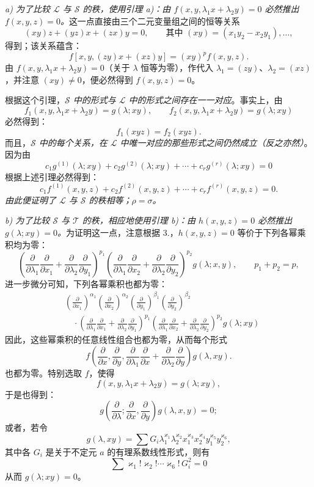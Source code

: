 \emph{a) 为了比较 $\mathcal L$ 与 $\mathcal S$ 的秩，使用引理 a)：由 $f(x,y,\lambda_1x+\lambda_2y)=0$ 必然推出 $f(x,y,z)=0$。}这一点直接由三个二元变量组之间的恒等关系
\[
  (xy)z+(yz)x+(zx)y=0,
  \qquad \text{其中 }(xy)=(x_1y_2-x_2y_1),\ldots,
\]
得到；该关系蕴含：
\[
  f[x,y,(zy)x+(xz)y]=(xy)^p f(x,y,z).
\]
由 $f(x,y,\lambda_1x+\lambda_2y)=0$（关于 $\lambda$ 恒等为零），作代入 $\lambda_1=(zy)$、$\lambda_2=(xz)$，并注意 $(xy)\ne0$，便必然得到 $f(x,y,z)=0$。

根据这个引理，\emph{$\mathcal S$ 中的形式与 $\mathcal L$ 中的形式之间存在一一对应}。事实上，由
\[
  f_1(x,y,\lambda_1x+\lambda_2y)=g(\lambda;xy),\qquad
  f_2(x,y,\lambda_1x+\lambda_2y)=g(\lambda;xy)
\]
必然得到：
\[
  f_1(xyz)=f_2(xyz).
\]
而且，\emph{$\mathcal S$ 中的每个关系，在 $\mathcal L$ 中唯一对应的那些形式之间仍然成立（反之亦然）}。因为由
\[
  c_1g^{(1)}(\lambda;xy)+c_2g^{(2)}(\lambda;xy)+\cdots+c_rg^{(r)}(\lambda;xy)=0
\]
根据上述引理必然得到：
\[
  c_1f^{(1)}(x,y,z)+c_2f^{(2)}(x,y,z)+\cdots+c_rf^{(r)}(x,y,z)=0.
\]
\emph{由此便证明了 $\mathcal L$ 与 $\mathcal S$ 的秩相等；$\rho=\sigma$。}

\emph{b) 为了比较 $\mathcal S$ 与 $\mathcal T$ 的秩，相应地使用引理 b)：由 $h(x,y,z)=0$ 必然推出 $g(\lambda;xy)=0$。}为证明这一点，注意根据 3.，$h(x,y,z)=0$ 等价于下列各幂乘积均为零：
\[
 \left(\frac{\partial}{\partial\lambda_1}\frac{\partial}{\partial x_1}
 +\frac{\partial}{\partial\lambda_2}\frac{\partial}{\partial y_1}\right)^{p_1}
 \left(\frac{\partial}{\partial\lambda_1}\frac{\partial}{\partial x_2}
 +\frac{\partial}{\partial\lambda_2}\frac{\partial}{\partial y_2}\right)^{p_2}g(\lambda;x,y),
 \qquad p_1+p_2=p,
\]
进一步微分可知，下列各幂乘积也都为零：
\[
\begin{aligned}
&\left(\frac{\partial}{\partial x_1}\right)^{\alpha_1}
 \left(\frac{\partial}{\partial x_2}\right)^{\alpha_2}
 \left(\frac{\partial}{\partial y_1}\right)^{\beta_1}
 \left(\frac{\partial}{\partial y_2}\right)^{\beta_2} \\
&\quad\cdot
 \left(\frac{\partial}{\partial\lambda_1}\frac{\partial}{\partial x_1}
 +\frac{\partial}{\partial\lambda_2}\frac{\partial}{\partial y_1}\right)^{p_1}
 \left(\frac{\partial}{\partial\lambda_1}\frac{\partial}{\partial x_2}
 +\frac{\partial}{\partial\lambda_2}\frac{\partial}{\partial y_2}\right)^{p_2}
 g(\lambda;xy)
\end{aligned}
\]
因此，这些幂乘积的任意线性组合也都为零，从而每个形式
\[
  f\left(\frac{\partial}{\partial x},\frac{\partial}{\partial y},
  \frac{\partial}{\partial\lambda_1}\frac{\partial}{\partial x}
  +\frac{\partial}{\partial\lambda_2}\frac{\partial}{\partial y}\right)g(\lambda,xy).
\]
也都为零。特别选取 $f$，使得
\[
  f(x,y,\lambda_1x+\lambda_2y)=g(\lambda;xy),
\]
于是也得到：
\[
  g\left(\frac{\partial}{\partial\lambda};
    \frac{\partial}{\partial x},
    \frac{\partial}{\partial y}\right)g(\lambda,x,y)=0;
\]
或者，若令
\[
  g(\lambda,xy)=\sum G_i\lambda_1^{\varkappa_1}\lambda_2^{\varkappa_2}
  x_1^{\varkappa_3}x_2^{\varkappa_4}y_1^{\varkappa_5}y_2^{\varkappa_6},
\]
其中各 $G_i$ 是关于不定元 $a$ 的有理系数线性形式，则有
\[
  \sum \varkappa_1!\varkappa_2!\cdots\varkappa_6!\,G_i^2=0
\]
从而 $g(\lambda;xy)=0$。

